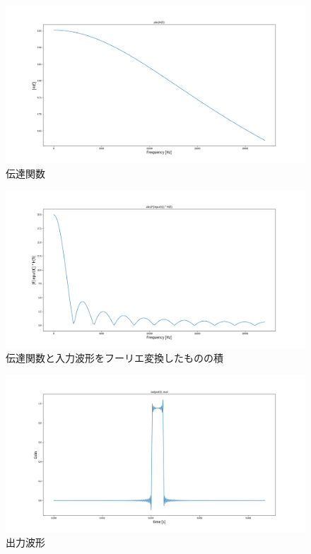 \documentclass[a4j,12pt,]{jarticle}
\begin{document}
\begin{figure}[H]
  \begin{center}
    \includegraphics[width=160mm]{report/openAtReceivingEndWithAttenuationConstant/frequencyTransferFunctionAbs.png}
    \caption{伝達関数}
    \label{p12}
  \end{center}
\end{figure}

\begin{figure}[H]
  \begin{center}
    \includegraphics[width=160mm]{report/openAtReceivingEndWithAttenuationConstant/productOfTFAndFTTOfInputWaveformAbs.png}
    \caption{伝達関数と入力波形をフーリエ変換したものの積}
    \label{p13}
  \end{center}
\end{figure}

\begin{figure}[H]
  \begin{center}
    \includegraphics[width=160mm]{report/openAtReceivingEndWithAttenuationConstant/outputWaveformTimeAxis.png}
    \caption{出力波形}
    \label{p14}
  \end{center}
\end{figure}
\end{document}
